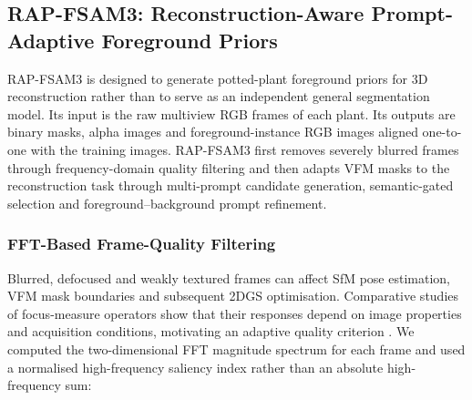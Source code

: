 \documentclass[a4paper]{cas-sc}
\begin{document}
\begin{table}[pos=!htbp]
\caption{Dataset coverage and end-to-end workflow execution for the two acquisition settings.}\label{tab:dataset-coverage}
\centering
\scriptsize
\setlength{\tabcolsep}{3pt}
\end{table}

\FloatBarrier

\subsection{RAP-FSAM3: Reconstruction-Aware Prompt-Adaptive Foreground Priors}\label{sec:rap-fsam3}

RAP-FSAM3 is designed to generate potted-plant foreground priors for 3D reconstruction rather than to serve as an independent general segmentation model. Its input is the raw multiview RGB frames of each plant. Its outputs are binary masks, alpha images and foreground-instance RGB images aligned one-to-one with the training images. RAP-FSAM3 first removes severely blurred frames through frequency-domain quality filtering and then adapts VFM masks to the reconstruction task through multi-prompt candidate generation, semantic-gated selection and foreground--background prompt refinement.

\subsubsection{FFT-Based Frame-Quality Filtering}\label{sec:fft-based-frame-quality-filtering}

Blurred, defocused and weakly textured frames can affect SfM pose estimation, VFM mask boundaries and subsequent 2DGS optimisation. Comparative studies of focus-measure operators show that their responses depend on image properties and acquisition conditions, motivating an adaptive quality criterion \cite{ref50}. We computed the two-dimensional FFT magnitude spectrum for each frame and used a normalised high-frequency saliency index rather than an absolute high-frequency sum:
\end{document}
